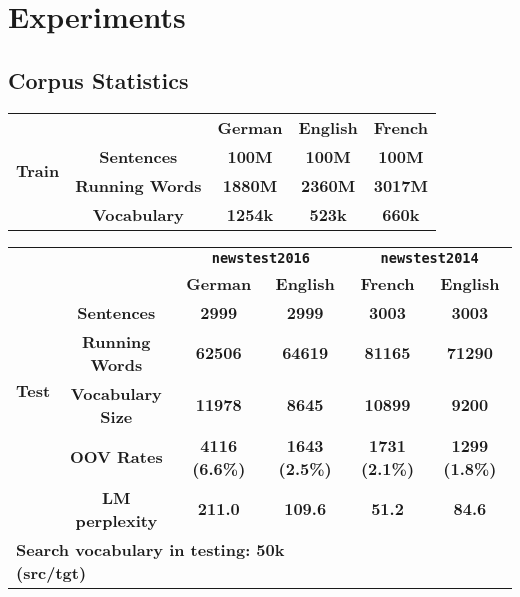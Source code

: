 \chapter{Experiments}

\section{Corpus Statistics}
\begin{table}
	\centering
	\begin{tabular}{c|c|c|c|c}
		\hline
		\multirow{4}{*}{\textbf{Train}} & \textbf{}              & \textbf{German} & \textbf{English} & \textbf{French} \\ \cline{2-5} 
		& \textbf{Sentences}     & \textbf{100M}   & \textbf{100M}    & \textbf{100M}   \\ \cline{2-5} 
		& \textbf{Running Words} & \textbf{1880M}  & \textbf{2360M}   & \textbf{3017M}  \\ \cline{2-5} 
		& \textbf{Vocabulary}    & \textbf{1254k}  & \textbf{523k}    & \textbf{660k}   \\ \hline
	\end{tabular}
	

	\centering

		\begin{tabular}{c|c|c|c|c|c}
			\hline
			\multirow{7}{*}{\textbf{Test}} & \textbf{}                      & \multicolumn{2}{c|}{\textbf{\texttt{newstest2016}}}    & \multicolumn{2}{c}{\textbf{\texttt{newstest2014}}}    \\ \cline{3-6} 
			& \multicolumn{1}{l|}{\textbf{}} & \textbf{German}       & \textbf{English}      & \textbf{French}       & \textbf{English}      \\ \cline{2-6} 
			& \textbf{Sentences}             & \textbf{2999}         & \textbf{2999}         & \textbf{3003}         & \textbf{3003}         \\ \cline{2-6} 
			& \textbf{Running Words}         & \textbf{62506}        & \textbf{64619}        & \textbf{81165}        & \textbf{71290}        \\ \cline{2-6} 
			& \textbf{Vocabulary Size}       & \textbf{11978}        & \textbf{8645}         & \textbf{10899}        & \textbf{9200}         \\ \cline{2-6} 
			& \textbf{OOV Rates}             & \textbf{4116 (6.6\%)} & \textbf{1643 (2.5\%)} & \textbf{1731 (2.1\%)} & \textbf{1299 (1.8\%)} \\ \cline{2-6} 
			& \textbf{LM perplexity}         & \textbf{211.0}        & \textbf{109.6}        & \textbf{51.2}         & \textbf{84.6}         \\ \hline
			\multicolumn{4}{l}{\textbf{Search vocabulary in testing: 50k (src/tgt)}} \\
			
	\end{tabular}
\end{table}

